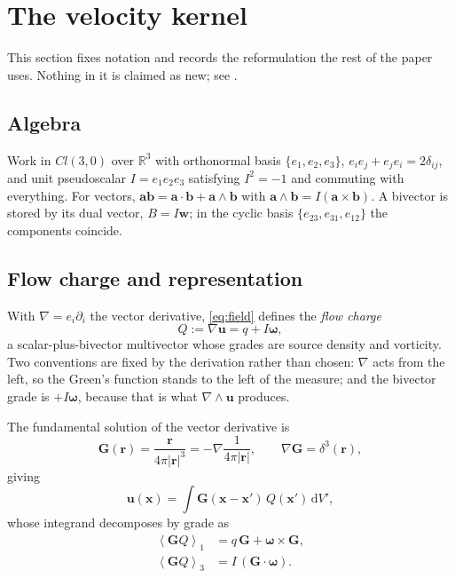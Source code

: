 \documentclass[preprint,12pt,3p]{elsarticle}
\theoremstyle{remark}
\newcommand{\grade}[2]{\left\langle #1 \right\rangle_{#2}}
\newcommand{\dd}{\mathrm{d}}
\newcommand{\bx}{\mathbf{x}}
\newcommand{\bu}{\mathbf{u}}
\newcommand{\br}{\mathbf{r}}
\newcommand{\bG}{\mathbf{G}}
\newcommand{\bomega}{\boldsymbol{\omega}}
\begin{document}
\section{The velocity kernel}
\label{sec:kernel}

This section fixes notation and records the reformulation the rest of the paper
uses. Nothing in it is claimed as new; see
\cite{hestenes1984,doran2003,gurlebeck1997book,sugon2024}.

\subsection{Algebra}

Work in $Cl(3,0)$ over $\mathbb{R}^3$ with orthonormal basis $\{e_1,e_2,e_3\}$,
$e_ie_j+e_je_i = 2\delta_{ij}$, and unit pseudoscalar $I = e_1e_2e_3$ satisfying
$I^2=-1$ and commuting with everything. For vectors,
$\mathbf{a}\mathbf{b} = \mathbf{a}\cdot\mathbf{b}+\mathbf{a}\wedge\mathbf{b}$
with $\mathbf{a}\wedge\mathbf{b} = I(\mathbf{a}\times\mathbf{b})$. A bivector is
stored by its dual vector, $B = I\mathbf{w}$; in the cyclic basis
$\{e_{23},e_{31},e_{12}\}$ the components coincide.

\subsection{Flow charge and representation}

With $\nabla = e_i\partial_i$ the vector derivative, \eqref{eq:field} defines
the \emph{flow charge}
\begin{equation}
  Q := \nabla\bu = q + I\bomega ,
\end{equation}
a scalar-plus-bivector multivector whose grades are source density and
vorticity. Two conventions are fixed by the derivation rather than chosen:
$\nabla$ acts from the left, so the Green's function stands to the left of the
measure; and the bivector grade is $+I\bomega$, because that is what
$\nabla\wedge\bu$ produces.

The fundamental solution of the vector derivative is
\begin{equation}
  \bG(\br) = \frac{\br}{4\pi|\br|^3} = -\nabla\frac{1}{4\pi|\br|},
  \qquad \nabla\bG = \delta^3(\br),
  \label{eq:green}
\end{equation}
giving
\begin{equation}
  \bu(\bx) = \int \bG(\bx-\bx')\,Q(\bx')\,\dd V' ,
  \label{eq:rep}
\end{equation}
whose integrand decomposes by grade as
\begin{align}
  \grade{\bG Q}{1} &= q\,\bG + \bomega\times\bG , \label{eq:grade1}\\
  \grade{\bG Q}{3} &= I\,(\bG\cdot\bomega) . \label{eq:grade3}
\end{align}
\end{document}
